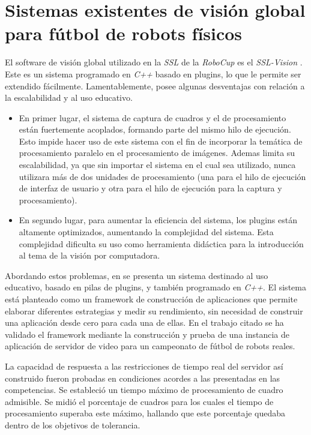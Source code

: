 
\section{Sistemas existentes de visión global para fútbol de robots físicos}

\label{svgExistentes}

El software de visión global utilizado en la \emph{SSL} de la \emph{RoboCup} es
el \emph{SSL-Vision} \cite{sslvision}. Este es un sistema programado en
\emph{C++} basado en plugins, lo que le permite ser extendido fácilmente.
Lamentablemente, posee algunas desventajas con relación a la escalabilidad y al
uso educativo.

\begin{itemize}

	\item 	En primer lugar, el sistema de captura de cuadros y el de
		procesamiento están fuertemente acoplados, formando parte del
		mismo hilo de ejecución. Esto impide hacer uso de este sistema
		con el fin de incorporar la temática de procesamiento paralelo
		en el procesamiento de imágenes. Ademas limita su escalabilidad,
		ya que sin importar el sistema en el cual sea utilizado, nunca
		utilizara más de dos unidades de procesamiento (una para el hilo
		de ejecución de interfaz de usuario y otra para el hilo de
		ejecución para la captura y procesamiento).

	\item 	En segundo lugar, para aumentar la eficiencia del sistema, los
		plugins están altamente optimizados, aumentando la complejidad
		del sistema. Esta complejidad dificulta su uso como herramienta
		didáctica para la introducción al tema de la visión por
		computadora.

\end{itemize}

Abordando estos problemas, en \cite{torres2014} se presenta un sistema destinado
al uso educativo, basado en pilas de plugins, y también programado en
\emph{C++}. El sistema está planteado como un framework de construcción de
aplicaciones que permite elaborar diferentes estrategias y medir su rendimiento,
sin necesidad de construir una aplicación desde cero para cada una de ellas. En
el trabajo citado se ha validado el framework mediante la construcción y prueba
de una instancia de aplicación de servidor de video para un campeonato de fútbol
de robots reales.

La capacidad de respuesta a las restricciones de tiempo real del servidor así
construido fueron probadas en condiciones acordes a las presentadas en las
competencias. Se estableció un tiempo máximo de procesamiento de cuadro
admisible. Se midió el porcentaje de cuadros para los cuales el tiempo de
procesamiento superaba este máximo, hallando que este porcentaje quedaba dentro
de los objetivos de tolerancia.

